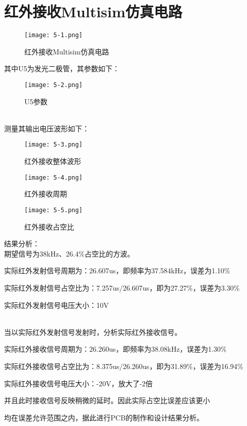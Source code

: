 \section{红外接收Multisim仿真电路}
\begin{figure}[H] %
    \centering
    \texttt{[image: 5-1.png]}
    \caption{红外接收Multisim仿真电路}
    \label{fig:xfig1}
\end{figure}

其中U5为发光二极管，其参数如下：

\begin{figure}[H] %
    \centering
    \texttt{[image: 5-2.png]}
    \caption{U5参数}
    \label{fig:xfig1}
 \end{figure}

 ~\\

测量其输出电压波形如下：
\begin{figure}[H] %
    \centering
    \texttt{[image: 5-3.png]}
    \caption{红外接收整体波形}
    \label{fig:xfig1}
\end{figure}
\begin{figure}[H] %
    \centering
    \texttt{[image: 5-4.png]}
    \caption{红外接收周期}
    \label{fig:xfig1}
\end{figure}
\begin{figure}[H] %
    \centering
    \texttt{[image: 5-5.png]}
    \caption{红外接收占空比}
    \label{fig:xfig1}
\end{figure}

结果分析：\\
期望信号为38kHz、26.4\%占空比的方波。

实际红外发射信号周期为：26.607us，即频率为37.584kHz，误差为1.10\%

实际红外发射信号占空比为：7.257us/26.607us，即为27.27\%，误差为3.30\%

实际红外发射信号电压大小：10V

~\\

当以实际红外发射信号发射时，分析实际红外接收信号。

实际红外接收信号周期为：26.260us，即频率为38.08kHz，误差为1.30\%

实际红外接收信号占空比为：8.375us/26.260us，即为31.89\%，误差为16.94\%

实际红外接收信号电压大小：-20V，放大了-2倍

并且此时接收信号反映稍微的延时。因此实际占空比误差应该更小



均在误差允许范围之内，据此进行PCB的制作和设计结果分析。
